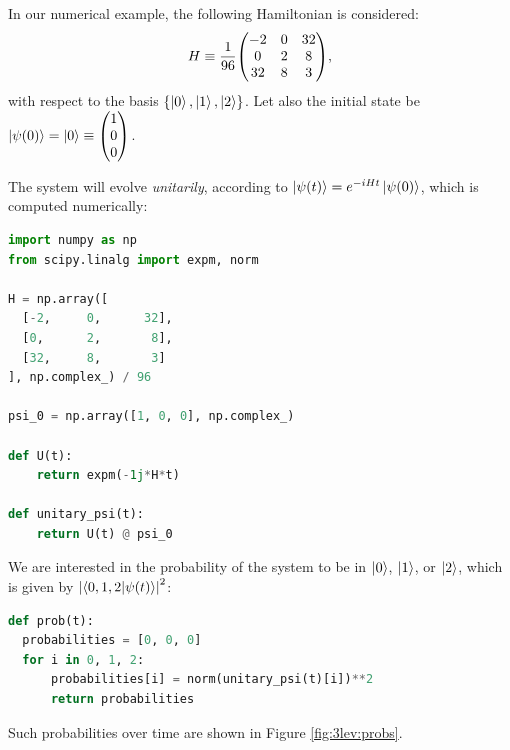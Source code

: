 In our numerical example, the following
Hamiltonian is considered:
\begin{equation}\label{eq:3lev:H}
  H \repr \frac{1}{96} \mqty(
    -2  & 0 & 32  \\
     0  & 2 & 8   \\
    32  & 8 & 3
  )
  \text{,}
\end{equation}
with respect to the
basis $\qty{\ket{0}, \ket{1}, \ket{2}}$.
Let also
the initial state be $\ket{\psi(0)} = \ket{0} \repr \mqty(1 \\ 0 \\ 0)$.

The system will evolve \emph{unitarily}, according to $\ket{\psi(t)} = e^{-i H t} \ket{\psi(0)}$,
which is computed numerically:
\begin{lstlisting}[language=Python]
import numpy as np
from scipy.linalg import expm, norm

H = np.array([
  [-2,     0,      32],
  [0,      2,       8],
  [32,     8,       3]
], np.complex_) / 96

psi_0 = np.array([1, 0, 0], np.complex_)

def U(t):
    return expm(-1j*H*t)

def unitary_psi(t):
    return U(t) @ psi_0
\end{lstlisting}

We are interested in the probability of the system to be in $\ket{0}$, $\ket{1}$, or $\ket{2}$,
which is given by $\abs{\braket{0, 1, 2}{\psi(t)}}^2$:
\begin{lstlisting}[language=Python]
def prob(t):
  probabilities = [0, 0, 0]
  for i in 0, 1, 2:
      probabilities[i] = norm(unitary_psi(t)[i])**2
      return probabilities
\end{lstlisting}
Such probabilities over time are shown in Figure \ref{fig:3lev:probs}.


